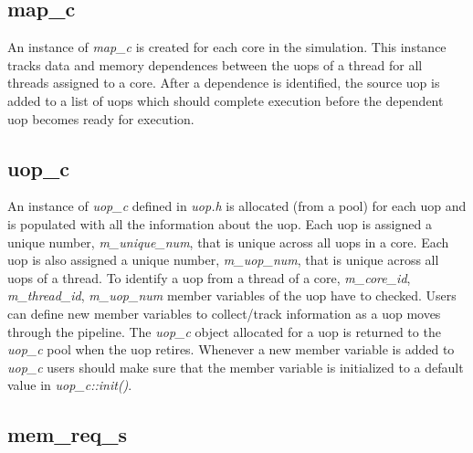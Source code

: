 
\subsection{map\_c}

An instance of \textit{map\_c} is created for each core in the simulation. This
instance tracks data and memory dependences between the uops of a thread for all
threads assigned to a core. After a dependence is identified, the source uop is
added to a list of uops which should complete execution before the dependent
uop becomes ready for execution.


\subsection{uop\_c}

An instance of \textit{uop\_c} defined in \textit{uop.h} is allocated (from a
pool) for each uop and is populated with all the information about the uop.
Each uop is assigned a unique number, \textit{m\_unique\_num}, that is unique
across all uops in a core. Each uop is also assigned a unique number,
\textit{m\_uop\_num}, that is unique across all uops of a thread. To
identify a uop from a thread of a core, \textit{m\_core\_id},
\textit{m\_thread\_id}, \textit{m\_uop\_num} member variables of the uop
have to checked. Users can define new member variables to collect/track
information as a uop moves through the pipeline. The \textit{uop\_c}
object allocated for a uop is returned to the \textit{uop\_c} pool when
the uop retires.  Whenever a new member variable is added to
\textit{uop\_c} users should make sure that the member variable is
initialized to a default value in \textit{uop\_c::init()}.

\subsection{mem\_req\_s}

